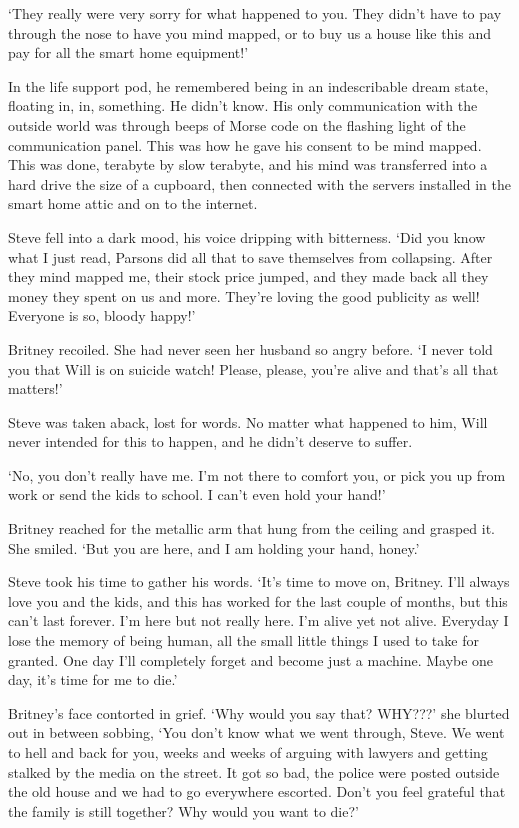 `They really were very sorry for what happened to you. They didn't have to pay through the nose to have you mind mapped, or to buy us a house like this and pay for all the smart home equipment!'

In the life support pod, he remembered being in an indescribable dream state, floating in, in, something. He didn't know. His only communication with the outside world was through beeps of Morse code on the flashing light of the communication panel. This was how he gave his consent to be mind mapped. This was done, terabyte by slow terabyte, and his mind was transferred into a hard drive the size of a cupboard, then connected with the servers installed in the smart home attic and on to the internet.

Steve fell into a dark mood, his voice dripping with bitterness. `Did you know what I just read, Parsons did all that to save themselves from collapsing. After they mind mapped me, their stock price jumped, and they made back all they money they spent on us and more. They're loving the good publicity as well! Everyone is so, bloody happy!'

Britney recoiled. She had never seen her husband so angry before. `I never told you that Will is on suicide watch! Please, please, you're alive and that's all that matters!'

Steve was taken aback, lost for words. No matter what happened to him, Will never intended for this to happen, and he didn't deserve to suffer. 

`No, you don't really have me. I'm not there to comfort you, or pick you up from work or send the kids to school. I can't even hold your hand!'

Britney reached for the metallic arm that hung from the ceiling and grasped it. She smiled. `But you are here, and I am holding your hand, honey.'

Steve took his time to gather his words. `It's time to move on, Britney. I'll always love you and the kids, and this has worked for the last couple of months, but this can't last forever. I'm here but not really here. I'm alive yet not alive. Everyday I lose the memory of being human, all the small little things I used to take for granted. One day I'll completely forget and become just a machine. Maybe one day, it's time for me to die.'

Britney's face contorted in grief. `Why would you say that? WHY???' she blurted out in between sobbing, `You don't know what we went through, Steve. We went to hell and back for you, weeks and weeks of arguing with lawyers and getting stalked by the media on the street. It got so bad, the police were posted outside the old house and we had to go everywhere escorted. Don't you feel grateful that the family is still together? Why would you want to die?'

